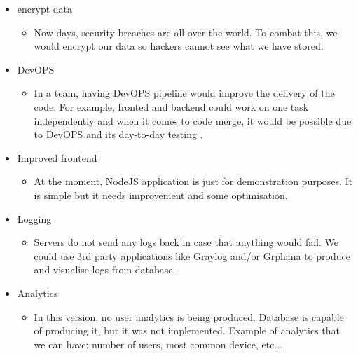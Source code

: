 \begin{itemize}
  \item encrypt data
  \begin{itemize}
    \item Now days, security breaches are all over the world. To combat this, we would encrypt our data so hackers cannot see what we have stored.
  \end{itemize}
  
  \item DevOPS
  \begin{itemize}
    \item In a team, having DevOPS pipeline would improve the delivery of the code. For example, fronted and backend could work on one task independently and when it comes to code merge, it would be possible due to DevOPS and its day-to-day testing \parencite{web:MSDevOPS}.
  \end{itemize}
  
  \item Improved frontend
  \begin{itemize}
    \item At the moment, NodeJS application is just for demonstration purposes. It is simple but it needs improvement and some optimisation.
  \end{itemize}
  
  \item Logging
  \begin{itemize}
    \item Servers do not send any logs back in case that anything would fail. We could use 3rd party applications like Graylog and/or Grphana to produce and visualise logs from database.
  \end{itemize}
  
  \item Analytics
  \begin{itemize}
    \item In this version, no user analytics is being produced. Database is capable of producing it, but it was not implemented. Example of analytics that we can have: number of users, most common device, etc...
  \end{itemize}
\end{itemize}
